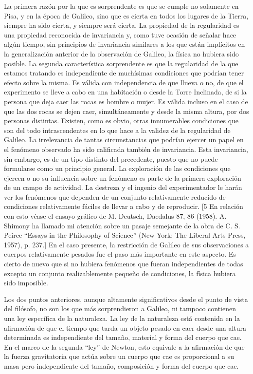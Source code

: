\documentclass[a4paper, 12pt]{article}
\begin{document}
La primera razón por la que es sorprendente es que se cumple no solamente en Pisa, y en la época de Galileo, sino que es cierta en todos los lugares de la Tierra, siempre ha sido cierta, y siempre será cierta. La propiedad de la regularidad es una propiedad reconocida de invariancia y, como tuve ocasión de señalar hace algún tiempo, sin principios de invariancia similares a los que están implícitos en la generalización anterior de la observación de Galileo, la física no hubiera sido posible. La segunda característica sorprendente es que la regularidad de la que estamos tratando es independiente de muchísimas condiciones que podrían tener efecto sobre la misma. Es válida con independencia de que llueva o no, de que el experimento se lleve a cabo en una habitación o desde la Torre Inclinada, de si la persona que deja caer las rocas es hombre o mujer. Es válida incluso en el caso de que las dos rocas se dejen caer, simultáneamente y desde la misma altura, por dos personas distintas. Existen, como es obvio, otras innumerables condiciones que son del todo intrascendentes en lo que hace a la validez de la regularidad de Galileo. La irrelevancia de tantas circunstancias que podrían ejercer un papel en el fenómeno observado ha sido calificada también de invariancia. Esta invariancia, sin embargo, es de un tipo distinto del precedente, puesto que no puede formularse como un principio general.  La exploración de las condiciones que ejercen o no su influencia sobre un fenómeno es parte de la primera exploración de un campo de actividad. La destreza y el ingenio del experimentador le harán ver los fenómenos que dependen de un conjunto relativamente reducido de condiciones relativamente fáciles de llevar a cabo y de reproducir. [5 En relación con esto véase el ensayo gráfico de M. Deutsch, Daedalus 87, 86 (1958). A. Shimony ha llamado mi atención sobre un pasaje semejante de la obra de C. S. Peirce ``Essays in the Philosophy of Science'' (New York: The Liberal Arts Press, 1957), p. 237.] En el caso presente, la restricción de Galileo de sus observaciones a cuerpos relativamente pesados fue el paso más importante en este aspecto. Es cierto de nuevo que si no hubiera fenómenos que fueran independientes de todas excepto un conjunto realizablemente pequeño de condiciones, la física hubiera sido imposible.

Los dos puntos anteriores, aunque altamente significativos desde el punto de vista del filósofo, no son los que más sorprendieron a Galileo, ni tampoco contienen una ley específica de la naturaleza. La ley de la naturaleza está contenida en la afirmación de que el tiempo que tarda un objeto pesado en caer desde una altura determinada es independiente del tamaño, material y forma del cuerpo que cae. En el marco de la segunda ``ley'' de Newton, esto equivale a la afirmación de que la fuerza gravitatoria que actúa sobre un cuerpo que cae es proporcional a su masa pero independiente del tamaño, composición y forma del cuerpo que cae.
\end{document}
